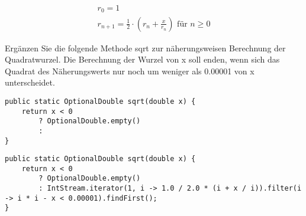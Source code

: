 \begin{align*}
    r_0 = 1 \\
    r_{n + 1} = \frac{1}{2} \cdot \left(r_n + \frac{x}{r_n}\right) \text{ für } n \geq 0
\end{align*}

Ergänzen Sie die folgende Methode sqrt zur näherungsweisen Berechnung der Quadratwurzel. Die
Berechnung der Wurzel von x soll enden, wenn sich das Quadrat des Näherungswerts nur noch um
weniger als 0.00001 von x unterscheidet.

\begin{lstlisting}
public static OptionalDouble sqrt(double x) {
    return x < 0
        ? OptionalDouble.empty()
        :
}
\end{lstlisting}

\begin{lstlisting}
public static OptionalDouble sqrt(double x) {
    return x < 0
        ? OptionalDouble.empty()
        : IntStream.iterator(1, i -> 1.0 / 2.0 * (i + x / i)).filter(i -> i * i - x < 0.00001).findFirst();
}
\end{lstlisting}